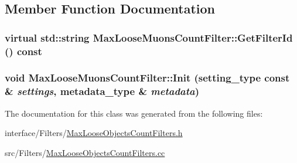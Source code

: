 \subsection{Member Function Documentation}
\hypertarget{classMaxLooseMuonsCountFilter_a9b8ffc6d02a83e06623ab8a16777a1db}{
\subsubsection[{GetFilterId}]{\setlength{\rightskip}{0pt plus 5cm}virtual std::string MaxLooseMuonsCountFilter::GetFilterId () const}}
\label{classMaxLooseMuonsCountFilter_a9b8ffc6d02a83e06623ab8a16777a1db}
\hypertarget{classMaxLooseMuonsCountFilter_ab7cee67d21f4e51ac1098f2ec372bfdf}{
\subsubsection[{Init}]{\setlength{\rightskip}{0pt plus 5cm}void MaxLooseMuonsCountFilter::Init (setting\_\-type const \& {\em settings}, \/  metadata\_\-type \& {\em metadata})}}
\label{classMaxLooseMuonsCountFilter_ab7cee67d21f4e51ac1098f2ec372bfdf}


The documentation for this class was generated from the following files:\begin{DoxyCompactItemize}
\item 
interface/Filters/\hyperlink{MaxLooseObjectsCountFilters_8h}{MaxLooseObjectsCountFilters.h}\item 
src/Filters/\hyperlink{MaxLooseObjectsCountFilters_8cc}{MaxLooseObjectsCountFilters.cc}\end{DoxyCompactItemize}
